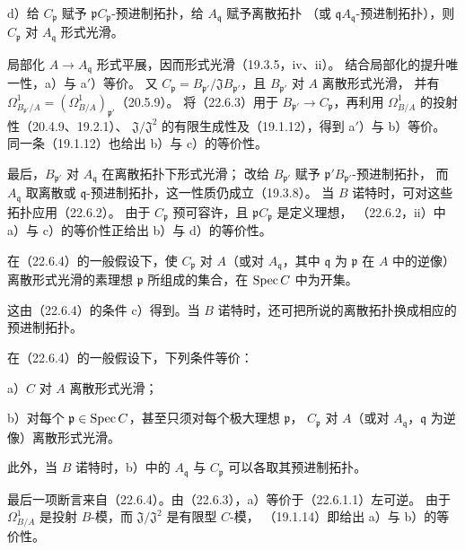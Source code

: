 \noindent d）给 $C_{\mathfrak p}$ 赋予 $\mathfrak pC_{\mathfrak p}$-预进制拓扑，给 $A_{\mathfrak q}$ 赋予离散拓扑
（或 $\mathfrak qA_{\mathfrak q}$-预进制拓扑），则 $C_{\mathfrak p}$ 对 $A_{\mathfrak q}$ 形式光滑。

\eproof
局部化 $A\to A_{\mathfrak q}$ 形式平展，因而形式光滑（19.3.5，iv、ii）。
结合局部化的提升唯一性，a）与 a$'$）等价。
又 $C_{\mathfrak p}=B_{\mathfrak p'}/\mathfrak JB_{\mathfrak p'}$，且 $B_{\mathfrak p'}$ 对 $A$ 离散形式光滑，
并有 $\Omega^1_{B_{\mathfrak p'}/A}=(\Omega^1_{B/A})_{\mathfrak p'}$（20.5.9）。
将（22.6.3）用于 $B_{\mathfrak p'}\to C_{\mathfrak p}$，再利用 $\Omega^1_{B/A}$ 的投射性（20.4.9、19.2.1）、
$\mathfrak J/\mathfrak J^2$ 的有限生成性及（19.1.12），得到 a$'$）与 b）等价。
同一条（19.1.12）也给出 b）与 c）的等价性。

最后，$B_{\mathfrak p'}$ 对 $A_{\mathfrak q}$ 在离散拓扑下形式光滑；
改给 $B_{\mathfrak p'}$ 赋予 $\mathfrak p'B_{\mathfrak p'}$-预进制拓扑，
而 $A_{\mathfrak q}$ 取离散或 $\mathfrak q$-预进制拓扑，这一性质仍成立（19.3.8）。
当 $B$ 诺特时，可对这些拓扑应用（22.6.2）。
由于 $C_{\mathfrak p}$ 预可容许，且 $\mathfrak pC_{\mathfrak p}$ 是定义理想，
（22.6.2，ii）中 a）与 c）的等价性正给出 b）与 d）的等价性。
\finishproof

在（22.6.4）的一般假设下，使 $C_{\mathfrak p}$ 对 $A$（或对 $A_{\mathfrak q}$，其中 $\mathfrak q$ 为 $\mathfrak p$ 在 $A$ 中的逆像）
离散形式光滑的素理想 $\mathfrak p$ 所组成的集合，在 $\operatorname{Spec} C$ 中为开集。

这由（22.6.4）的条件 c）得到。当 $B$ 诺特时，还可把所说的离散拓扑换成相应的预进制拓扑。

在（22.6.4）的一般假设下，下列条件等价：

\noindent a）$C$ 对 $A$ 离散形式光滑；

\noindent b）对每个 $\mathfrak p\in\operatorname{Spec} C$，甚至只须对每个极大理想 $\mathfrak p$，
$C_{\mathfrak p}$ 对 $A$（或对 $A_{\mathfrak q}$，$\mathfrak q$ 为逆像）离散形式光滑。

此外，当 $B$ 诺特时，b）中的 $A_{\mathfrak q}$ 与 $C_{\mathfrak p}$ 可以各取其预进制拓扑。

\eproof
最后一项断言来自（22.6.4）。由（22.6.3），a）等价于（22.6.1.1）左可逆。
由于 $\Omega^1_{B/A}$ 是投射 $B$-模，而 $\mathfrak J/\mathfrak J^2$ 是有限型 $C$-模，
（19.1.14）即给出 a）与 b）的等价性。
\finishproof

